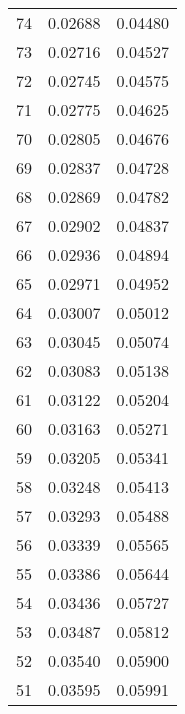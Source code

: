 \documentclass[11pt]{article}
\begin{document}
\begin{minipage}[l]{.3\linewidth}
\begin{tabular}{r|rr}
74&0.02688&0.04480\\ 
73&0.02716&0.04527\\ 
72&0.02745&0.04575\\ 
71&0.02775&0.04625\\ 
70&0.02805&0.04676\\ 
69&0.02837&0.04728\\ 
68&0.02869&0.04782\\ 
67&0.02902&0.04837\\ 
66&0.02936&0.04894\\ 
65&0.02971&0.04952\\ 
64&0.03007&0.05012\\ 
63&0.03045&0.05074\\ 
62&0.03083&0.05138\\ 
61&0.03122&0.05204\\ 
60&0.03163&0.05271\\ 
59&0.03205&0.05341\\ 
58&0.03248&0.05413\\ 
57&0.03293&0.05488\\ 
56&0.03339&0.05565\\ 
55&0.03386&0.05644\\ 
54&0.03436&0.05727\\ 
53&0.03487&0.05812\\ 
52&0.03540&0.05900\\ 
51&0.03595&0.05991\\ 
\end{tabular}
\end{minipage}
\hfill
\end{document}
